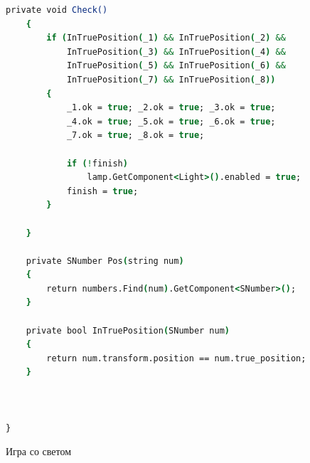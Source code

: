 \begin{lstlisting}[language=csh]
   private void Check()
    {
        if (InTruePosition(_1) && InTruePosition(_2) &&
            InTruePosition(_3) && InTruePosition(_4) &&
            InTruePosition(_5) && InTruePosition(_6) &&
            InTruePosition(_7) && InTruePosition(_8))
        {
            _1.ok = true; _2.ok = true; _3.ok = true;
            _4.ok = true; _5.ok = true; _6.ok = true;
            _7.ok = true; _8.ok = true;

            if (!finish)
                lamp.GetComponent<Light>().enabled = true;
            finish = true;
        }

    }

    private SNumber Pos(string num)
    {
        return numbers.Find(num).GetComponent<SNumber>();
    }

    private bool InTruePosition(SNumber num)
    {
        return num.transform.position == num.true_position;
    }



}
\end{lstlisting}

 Игра со светом

